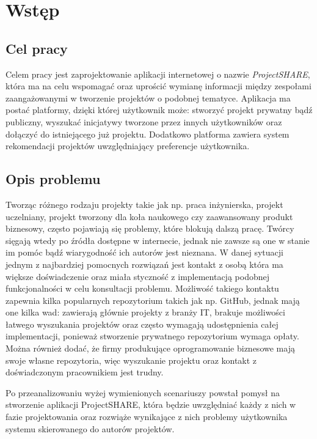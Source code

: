 \chapter{Wstęp}
\label{cha:wstep}

\section{Cel pracy}
\label{sec:celPracy}

Celem pracy jest zaprojektowanie aplikacji internetowej o nazwie \mbox{\textit{ProjectSHARE}}, która ma na celu wspomagać oraz uprościć wymianę informacji między zespołami zaangażowanymi w tworzenie
projektów o podobnej tematyce. Aplikacja ma postać platformy, dzięki której użytkownik
może: stworzyć projekt prywatny bądź publiczny, wyszukać inicjatywy tworzone przez
innych użytkowników oraz dołączyć do istniejącego już projektu. Dodatkowo platforma zawiera system rekomendacji projektów uwzględniający preferencje użytkownika.

\section{Opis problemu}
\label{sec:opisProblemu}
Tworząc różnego rodzaju projekty takie jak np. praca inżynierska, projekt uczelniany, 
projekt tworzony dla koła naukowego czy zaawansowany produkt biznesowy, często pojawiają się
problemy, które blokują dalszą pracę. Twórcy sięgają wtedy po źródła dostępne w
internecie, jednak nie zawsze są one w stanie im pomóc bądź wiarygodność ich autorów jest
nieznana. W danej sytuacji jednym z najbardziej pomocnych rozwiązań jest kontakt z osobą
która ma większe doświadczenie oraz miała styczność z implementacją podobnej
funkcjonalności w celu konsultacji problemu. Możliwość takiego kontaktu zapewnia kilka
popularnych repozytorium takich jak np. GitHub, jednak mają one kilka wad: zawierają głównie
projekty z branży IT, brakuje możliwości łatwego wyszukania projektów oraz często
wymagają udostępnienia całej implementacji, ponieważ stworzenie prywatnego
repozytorium wymaga opłaty. Można również dodać, że firmy produkujące oprogramowanie
biznesowe mają swoje własne repozytoria, więc wyszukanie projektu oraz kontakt z
doświadczonym pracownikiem jest trudny. 


Po przeanalizowaniu wyżej wymienionych scenariuszy powstał pomysł na stworzenie aplikacji         
\mbox{ProjectSHARE}, która będzie uwzględniać każdy z nich w fazie projektowania oraz rozwiąże wynikające z nich problemy użytkownika systemu skierowanego do autorów projektów.

